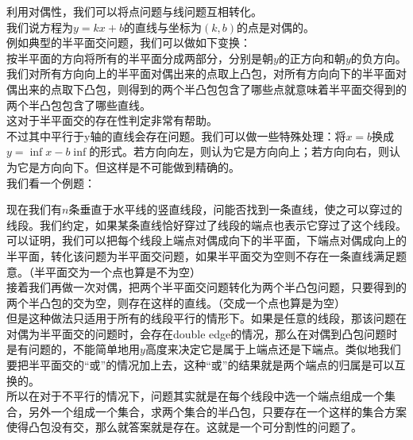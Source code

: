 利用对偶性，我们可以将点问题与线问题互相转化。 \\
我们说方程为$y=kx+b$的直线与坐标为$(k,b)$的点是对偶的。 \\

例如典型的半平面交问题，我们可以做如下变换： \\
按半平面的方向将所有的半平面分成两部分，分别是朝$y$的正方向和朝$y$的负方向。 \\
我们对所有方向向上的半平面对偶出来的点取上凸包，对所有方向向下的半平面对偶出来的点取下凸包，则得到的两个半凸包包含了哪些点就意味着半平面交得到的两个半凸包包含了哪些直线。 \\
这对于半平面交的存在性判定非常有帮助。 \\
不过其中平行于y轴的直线会存在问题。我们可以做一些特殊处理：将$x=b$换成$y=\inf x-b\inf$的形式。若方向向左，则认为它是方向向上；若方向向右，则认为它是方向向下。但这样是不可能做到精确的。 \\

我们看一个例题：

现在我们有$n$条垂直于水平线的竖直线段，问能否找到一条直线，使之可以穿过的线段。我们约定，如果某条直线恰好穿过了线段的端点也表示它穿过了这个线段。 \\

可以证明，我们可以把每个线段上端点对偶成向下的半平面，下端点对偶成向上的半平面，转化该问题为半平面交问题，如果半平面交为空则不存在一条直线满足题意。（半平面交为一个点也算是不为空） \\
接着我们再做一次对偶，把两个半平面交问题转化为两个半凸包问题，只要得到的两个半凸包的交为空，则存在这样的直线。（交成一个点也算是为空） \\

但是这种做法只适用于所有的线段平行的情形下。如果是任意的线段，那该问题在对偶为半平面交的问题时，会存在double edge的情况，那么在对偶到凸包问题时是有问题的，不能简单地用$y$高度来决定它是属于上端点还是下端点。类似地我们要把半平面交的“或”的情况加上去，这种“或”的结果就是两个端点的归属是可以互换的。 \\

所以在对于不平行的情况下，问题其实就是在每个线段中选一个端点组成一个集合，另外一个组成一个集合，求两个集合的半凸包，只要存在一个这样的集合方案使得凸包没有交，那么就答案就是存在。这就是一个可分割性的问题了。 \\


